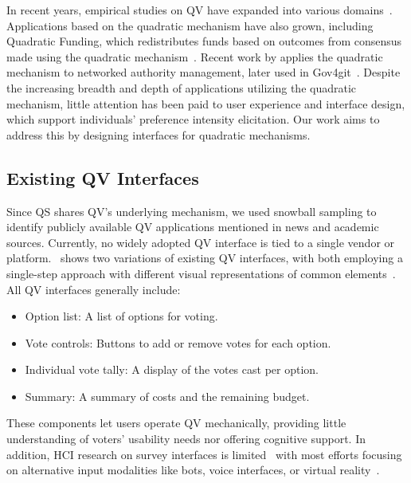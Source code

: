 In recent years, empirical studies on QV have expanded into various domains~\cite{naylor2017first, cavaille2024cares}. Applications based on the quadratic mechanism have also grown, including Quadratic Funding, which redistributes funds based on outcomes from consensus made using the quadratic mechanism~\cite{buterinFlexibleDesignFunding2019a, freitasQuadraticFundingIncomplete2024}. Recent work by \citet{southPluralManagement2024} applies the quadratic mechanism to networked authority management, later used in Gov4git~\cite{Gov4gitDecentralizedPlatform2023}. Despite the increasing breadth and depth of applications utilizing the quadratic mechanism, little attention has been paid to user experience and interface design, which support individuals' preference intensity elicitation. Our work aims to address this by designing interfaces for quadratic mechanisms.

\subsection{Existing QV Interfaces}
\label{sec:related_qv}

Since QS shares QV's underlying mechanism, we used snowball sampling to identify publicly available QV applications mentioned in news and academic sources. Currently, no widely adopted QV interface is tied to a single vendor or platform.~ shows two variations of existing QV interfaces, with both employing a single-step approach with different visual representations of common elements~\cite{Gov4gitDecentralizedPlatform2023, yehjxraymondYehjxraymondQvapp2024, chengCanShowWhat2021, cavaille2024cares}. All QV interfaces generally include:

\begin{itemize}[leftmargin=*]
    \item Option list: A list of options for voting.
    \item Vote controls: Buttons to add or remove votes for each option.
    \item Individual vote tally: A display of the votes cast per option.
    \item Summary: A summary of costs and the remaining budget.
\end{itemize}

These components let users operate QV mechanically, providing little understanding of voters' usability needs nor offering cognitive support. In addition, HCI research on survey interfaces is limited~\cite{nobarany2012design, van2007design} with most efforts focusing on alternative input modalities like bots, voice interfaces, or virtual reality~\cite{voiceWei2022, khullar2021, kimComparingDataChatbot2019, feick2020virtual}.

